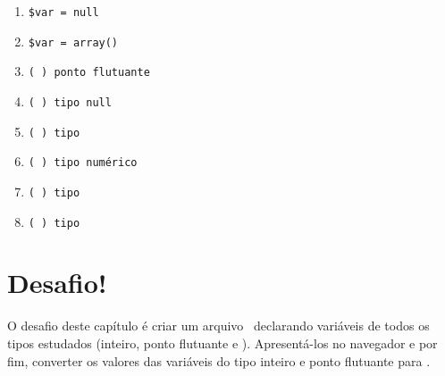 \begin{description}[labelindent=30pt]
\begin{multicols}{2}
\begin{enumerate}
      \item[] \texttt{\$var = null}
      \item[] \texttt{\$var = array()}
      \item[] \texttt{( ) ponto flutuante}
      \item[] \texttt{( ) tipo null}
      \item[] \texttt{( ) tipo \tipostring}
      \item[] \texttt{( ) tipo numérico}
      \item[] \texttt{( ) tipo \booleano}
      \item[] \texttt{( ) tipo \tipoarray}
    \end{enumerate}
  \end{multicols}



\end{description}




\section{Desafio!}
\label{cap3-desafio}
O desafio deste capítulo é criar um arquivo \phpextensao~declarando variáveis de todos os tipos
estudados (inteiro, ponto flutuante e \tipostring). Apresentá-los no navegador e por fim, converter
os valores das variáveis do tipo inteiro e ponto flutuante para \tipostring.
